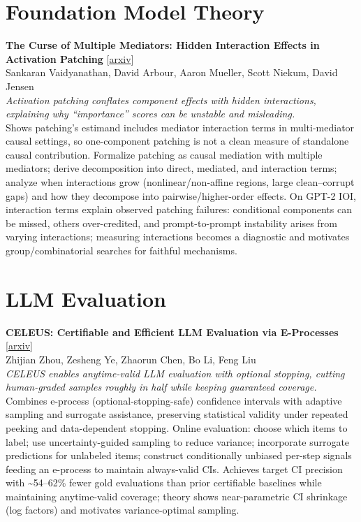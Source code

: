 \documentclass[12pt,letterpaper]{article}
\begin{document}
\medskip


\section*{Foundation Model Theory}

{\small\textbf{The Curse of Multiple Mediators: Hidden Interaction Effects in Activation Patching}} {\scriptsize[\href{https://arxiv.org/abs/2606.27510}{arxiv}]}\\
{\scriptsize Sankaran Vaidyanathan, David Arbour, Aaron Mueller, Scott Niekum, David Jensen}\\

{\small\textit{Activation patching conflates component effects with hidden interactions, explaining why ``importance'' scores can be unstable and misleading.}}\\[1pt]
{\footnotesize Shows patching's estimand includes mediator interaction terms in multi-mediator causal settings, so one-component patching is not a clean measure of standalone causal contribution. Formalize patching as causal mediation with multiple mediators; derive decomposition into direct, mediated, and interaction terms; analyze when interactions grow (nonlinear/non-affine regions, large clean--corrupt gaps) and how they decompose into pairwise/higher-order effects. On GPT-2 IOI, interaction terms explain observed patching failures: conditional components can be missed, others over-credited, and prompt-to-prompt instability arises from varying interactions; measuring interactions becomes a diagnostic and motivates group/combinatorial searches for faithful mechanisms.}

\medskip


\section*{LLM Evaluation}

{\small\textbf{CELEUS: Certifiable and Efficient LLM Evaluation via E-Processes}} {\scriptsize[\href{https://arxiv.org/abs/2606.20820}{arxiv}]}\\
{\scriptsize Zhijian Zhou, Zesheng Ye, Zhaorun Chen, Bo Li, Feng Liu}\\

{\small\textit{CELEUS enables anytime-valid LLM evaluation with optional stopping, cutting human-graded samples roughly in half while keeping guaranteed coverage.}}\\[1pt]
{\footnotesize Combines e-process (optional-stopping-safe) confidence intervals with adaptive sampling and surrogate assistance, preserving statistical validity under repeated peeking and data-dependent stopping. Online evaluation: choose which items to label; use uncertainty-guided sampling to reduce variance; incorporate surrogate predictions for unlabeled items; construct conditionally unbiased per-step signals feeding an e-process to maintain always-valid CIs. Achieves target CI precision with \textasciitilde{}54--62\% fewer gold evaluations than prior certifiable baselines while maintaining anytime-valid coverage; theory shows near-parametric CI shrinkage (log factors) and motivates variance-optimal sampling.}
\end{document}
